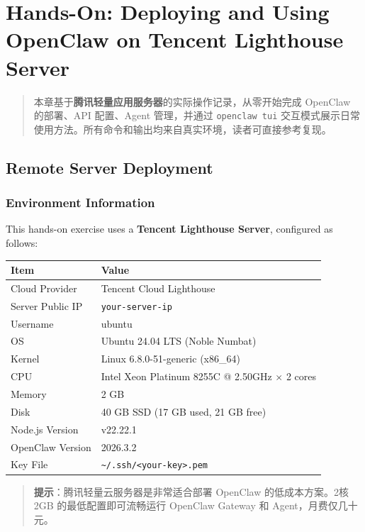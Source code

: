 \chapter{Hands-On: Deploying and Using OpenClaw on Tencent Lighthouse Server}

\begin{quote}
本章基于\textbf{腾讯轻量应用服务器}的实际操作记录，从零开始完成 OpenClaw 的部署、API 配置、Agent 管理，并通过 \texttt{openclaw tui} 交互模式展示日常使用方法。所有命令和输出均来自真实环境，读者可直接参考复现。
\end{quote}

\section{Remote Server Deployment}


\subsection{Environment Information}

This hands-on exercise uses a \textbf{Tencent Lighthouse Server}, configured as follows:

\begin{table}[h]
\centering
\small
\begin{tabular}{|l|p{}|}
\hline
Item & Value \\
\hline
Cloud Provider & Tencent Cloud Lighthouse \\
\hline
Server Public IP & \texttt{your-server-ip} \\
\hline
Username & ubuntu \\
\hline
OS & Ubuntu 24.04 LTS (Noble Numbat) \\
\hline
Kernel & Linux 6.8.0-51-generic (x86\_64) \\
\hline
CPU & Intel Xeon Platinum 8255C @ 2.50GHz $\times$ 2 cores \\
\hline
Memory & 2 GB \\
\hline
Disk & 40 GB SSD (17 GB used, 21 GB free) \\
\hline
Node.js Version & v22.22.1 \\
\hline
OpenClaw Version & 2026.3.2 \\
\hline
Key File & \texttt{\textasciitilde{}/.ssh/<your-key>.pem} \\
\hline
\end{tabular}
\end{table}

\begin{quote}
\textbf{提示}：腾讯轻量云服务器是非常适合部署 OpenClaw 的低成本方案。2核2GB 的最低配置即可流畅运行 OpenClaw Gateway 和 Agent，月费仅几十元。
\end{quote}

